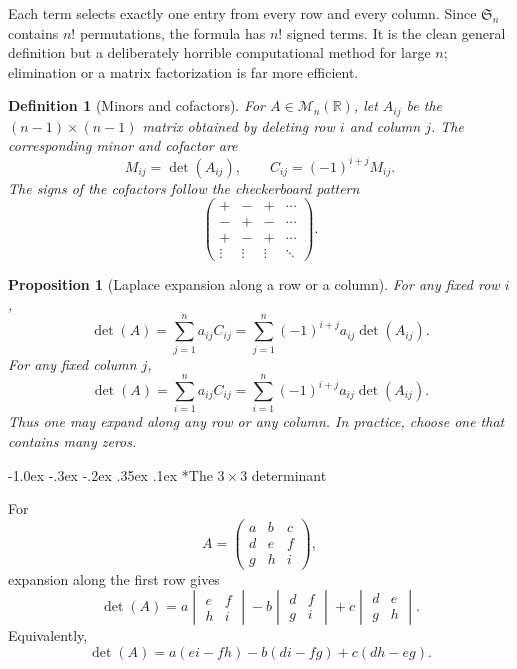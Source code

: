 \documentclass[10pt]{article}
\makeatletter
\renewcommand\subsection{\@startsection{subsection}{2}{\z@}%
  {-1.0ex \@plus -.3ex \@minus -.2ex}%
  {.35ex \@plus .1ex}%
  {\normalfont\normalsize\bfseries}}
\theoremstyle{compactdefinition}
\newtheorem{definition}{Definition}[section]
\theoremstyle{compactproposition}
\newtheorem{proposition}{Proposition}[section]
\newcommand{\R}{\mathbb{R}}
\newcommand{\M}{\mathcal{M}}
\makeatother
\begin{document}
Each term selects exactly one entry from every row and every column. Since
$\mathfrak S_n$ contains $n!$ permutations, the formula has $n!$ signed terms.
It is the clean general definition but a deliberately horrible computational
method for large $n$; elimination or a matrix factorization is far more
efficient.

\begin{definition}[Minors and cofactors]
For $A\in\M_n(\R)$, let $A_{ij}$ be the $(n-1)\times(n-1)$ matrix obtained by
deleting row $i$ and column $j$. The corresponding minor and cofactor are
\[
M_{ij}=\det(A_{ij}),
\qquad
C_{ij}=(-1)^{i+j}M_{ij}.
\]
The signs of the cofactors follow the checkerboard pattern
\[
\begin{pmatrix}
+&-&+&\cdots\\
-&+&-&\cdots\\
+&-&+&\cdots\\
\vdots&\vdots&\vdots&\ddots
\end{pmatrix}.
\]
\end{definition}

\begin{proposition}[Laplace expansion along a row or a column]
For any fixed row $i$,
\[
\boxed{\det(A)=\sum_{j=1}^n a_{ij}C_{ij}
=\sum_{j=1}^n(-1)^{i+j}a_{ij}\det(A_{ij}).}
\]
For any fixed column $j$,
\[
\boxed{\det(A)=\sum_{i=1}^n a_{ij}C_{ij}
=\sum_{i=1}^n(-1)^{i+j}a_{ij}\det(A_{ij}).}
\]
Thus one may expand along any row or any column. In practice, choose one that
contains many zeros.
\end{proposition}

\subsection*{The $3\times3$ determinant}

For
\[
A=
\begin{pmatrix}
a&b&c\\
d&e&f\\
g&h&i
\end{pmatrix},
\]
expansion along the first row gives
\[
\det(A)
=
a
\begin{vmatrix}
e&f\\
h&i
\end{vmatrix}
-
b
\begin{vmatrix}
d&f\\
g&i
\end{vmatrix}
+
c
\begin{vmatrix}
d&e\\
g&h
\end{vmatrix}.
\]
Equivalently,
\[
\det(A)=a(ei-fh)-b(di-fg)+c(dh-eg).
\]
\end{document}
